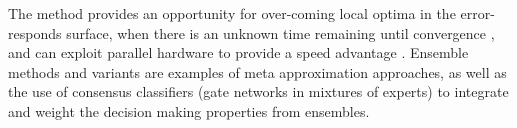 The method provides an opportunity for over-coming local optima in the error-responds surface, when there is an unknown time remaining until convergence \cite{Magdon-ismail2000}, and can exploit parallel hardware to provide a speed advantage \cite{Blas2005}. Ensemble methods and variants are examples of meta approximation approaches, as well as the use of consensus classifiers (gate networks in mixtures of experts) to integrate and weight the decision making properties from ensembles. 

